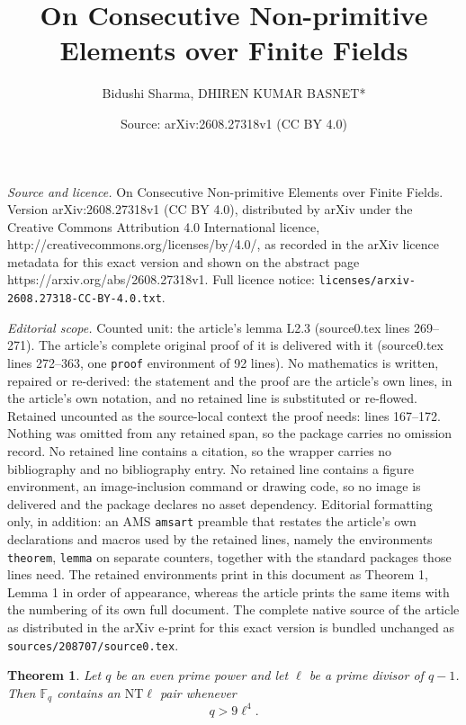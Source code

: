\documentclass[10pt,a4paper]{amsart}
\title{On Consecutive Non-primitive Elements over Finite Fields}
\author{Bidushi Sharma, DHIREN KUMAR BASNET*}
\date{Source: arXiv:2608.27318v1 (CC BY 4.0)}
\newtheorem{theorem}{Theorem}
\begin{document}
\maketitle

\noindent\emph{Source and licence.} On Consecutive Non-primitive Elements over Finite Fields. Version arXiv:2608.27318v1 (CC BY 4.0), distributed by arXiv under the Creative Commons Attribution 4.0 International licence, http://creativecommons.org/licenses/by/4.0/, as recorded in the arXiv licence metadata for this exact version and shown on the abstract page https://arxiv.org/abs/2608.27318v1. Full licence notice: \texttt{licenses/arxiv-2608.27318-CC-BY-4.0.txt}.\par\smallskip

\noindent\textit{Editorial scope.} Counted unit: the article's lemma L2.3 (source0.tex lines 269--271). The article's complete original proof of it is delivered with it (source0.tex lines 272--363, one \texttt{proof} environment of 92 lines). No mathematics is written, repaired or re-derived: the statement and the proof are the article's own lines, in the article's own notation, and no retained line is substituted or re-flowed.  Retained uncounted as the source-local context the proof needs: lines 167--172.  Nothing was omitted from any retained span, so the package carries no omission record.  No retained line contains a citation, so the wrapper carries no bibliography and no bibliography entry.  No retained line contains a figure environment, an image-inclusion command or drawing code, so no image is delivered and the package declares no asset dependency.  Editorial formatting only, in addition: an AMS \texttt{amsart} preamble that restates the article's own declarations and macros used by the retained lines, namely the environments \texttt{theorem}, \texttt{lemma} on separate counters, together with the standard packages those lines need.  The retained environments print in this document as Theorem 1, Lemma 1 in order of appearance, whereas the article prints the same items with the numbering of its own full document.  The complete native source of the article as distributed in the arXiv e-print for this exact version is bundled unchanged as \texttt{sources/208707/source0.tex}.
\begin{theorem}\label{T2.1}
Let $q$ be an even prime power and let $\ell$ be a prime divisor of $q-1$. Then $\mathbb{F}_q$ contains an $\mathrm{NT}\ell$ pair whenever
\[
q>9\ell^4.
\]
\end{theorem}
\end{document}
